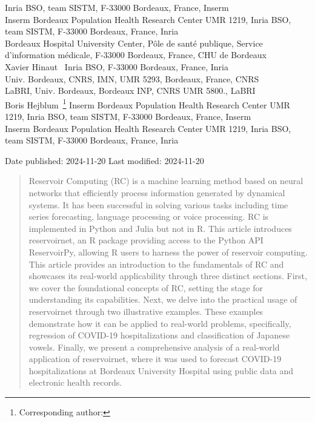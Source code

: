 \documentclass[
  11pt,
  a4paper,
]{article}
\theoremstyle{plain}
\theoremstyle{remark}
\begin{document}
\begin{center}
Inria BSO, team SISTM, F-33000 Bordeaux, France, Inserm\\
              Inserm Bordeaux Population Health Research Center UMR
1219, Inria BSO, team SISTM, F-33000 Bordeaux, France, Inria\\
              Bordeaux Hospital University Center, Pôle de santé
publique, Service d'information médicale, F-33000 Bordeaux, France, CHU
de Bordeaux\\
                 Xavier Hinaut~\quad
             Inria BSO, F-33000 Bordeaux, France, Inria\\
              Univ. Bordeaux, CNRS, IMN, UMR 5293, Bordeaux,
France, CNRS\\
              LaBRI, Univ. Bordeaux, Bordeaux INP, CNRS UMR
5800., LaBRI\\
                 Boris
Hejblum~\footnote{Corresponding author: }\quad
             Inserm Bordeaux Population Health Research Center UMR 1219,
Inria BSO, team SISTM, F-33000 Bordeaux, France, Inserm\\
              Inserm Bordeaux Population Health Research Center UMR
1219, Inria BSO, team SISTM, F-33000 Bordeaux, France, Inria\\
           
  \bigskip
  
  Date published: 2024-11-20 \quad Last modified: 2024-11-20
\end{center}
      
\bigskip
\begin{abstract}
Reservoir Computing (RC) is a machine learning method based on neural
networks that efficiently process information generated by dynamical
systems. It has been successful in solving various tasks including time
series forecasting, language processing or voice processing. RC is
implemented in Python and Julia but not in R. This article introduces
reservoirnet, an R package providing access to the Python API
ReservoirPy, allowing R users to harness the power of reservoir
computing. This article provides an introduction to the fundamentals of
RC and showcases its real-world applicability through three distinct
sections. First, we cover the foundational concepts of RC, setting the
stage for understanding its capabilities. Next, we delve into the
practical usage of reservoirnet through two illustrative examples. These
examples demonstrate how it can be applied to real-world problems,
specifically, regression of COVID-19 hospitalizations and classification
of Japanese vowels. Finally, we present a comprehensive analysis of a
real-world application of reservoirnet, where it was used to forecast
COVID-19 hospitalizations at Bordeaux University Hospital using public
data and electronic health records.
\end{abstract}
\end{document}
